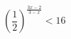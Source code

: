 \begin{ex}[type=inequality]
	\begin{condition}
		\( \left( \dfrac{1}{2} \right)^{\frac{3x-2}{3-x}}<16 \)
	\end{condition}
\end{ex}